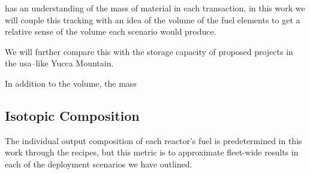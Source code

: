 \cyclus has an understanding of the mass of material in each
transaction, in this work we will couple this tracking with an idea of
the volume of the fuel elements to get a relative sense of the volume
each scenario would produce.

We will further compare this with the storage capacity of proposed
projects in the \gls{usa}--like Yucca Mountain.

In addition to the volume, the mass %

\subsection{Isotopic Composition}

The individual output composition of each reactor's fuel is
predetermined in this work through the recipes, but this metric is to
approximate fleet-wide results in each of the deployment scenarios we
have outlined.